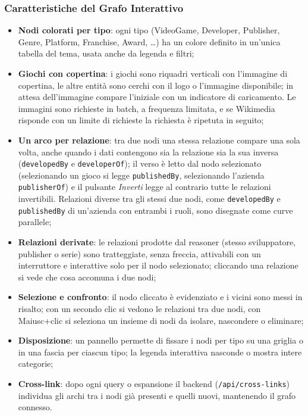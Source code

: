 \subsubsection{Caratteristiche del Grafo Interattivo}

\begin{itemize}[nosep]
  \item \textbf{Nodi colorati per tipo}: ogni tipo (VideoGame, Developer, Publisher, Genre, Platform,
    Franchise, Award, \dots) ha un colore definito in un'unica tabella del tema, usata anche da legenda e
    filtri;
  \item \textbf{Giochi con copertina}: i giochi sono riquadri verticali con l'immagine di copertina, le altre
    entit\`a sono cerchi con il logo o l'immagine disponibile; in attesa dell'immagine compare l'iniziale
    con un indicatore di caricamento. Le immagini sono richieste in batch, a frequenza limitata, e se
    Wikimedia risponde con un limite di richieste la richiesta \`e ripetuta in seguito;
  \item \textbf{Un arco per relazione}: tra due nodi una stessa relazione compare una sola volta, anche
    quando i dati contengono sia la relazione sia la sua inversa (\texttt{developedBy} e
    \texttt{developerOf}); il verso \`e letto dal nodo selezionato (selezionando un gioco si legge
    \texttt{publishedBy}, selezionando l'azienda \texttt{publisherOf}) e il pulsante \emph{Inverti} legge
    al contrario tutte le relazioni invertibili. Relazioni diverse tra gli stessi due nodi, come
    \texttt{developedBy} e \texttt{publishedBy} di un'azienda con entrambi i ruoli, sono disegnate come
    curve parallele;
  \item \textbf{Relazioni derivate}: le relazioni prodotte dal reasoner (stesso sviluppatore, publisher o
    serie) sono tratteggiate, senza freccia, attivabili con un interruttore e interattive solo per il nodo
    selezionato; cliccando una relazione si vede che cosa accomuna i due nodi;
  \item \textbf{Selezione e confronto}: il nodo cliccato \`e evidenziato e i vicini sono messi in
    risalto; con un secondo clic si vedono le relazioni tra due nodi, con Maiusc{+}clic si seleziona un
    insieme di nodi da isolare, nascondere o eliminare;
  \item \textbf{Disposizione}: un pannello permette di fissare i nodi per tipo su una griglia o in una fascia
    per ciascun tipo; la legenda interattiva nasconde o mostra intere categorie;
  \item \textbf{Cross-link}: dopo ogni query o espansione il backend (\texttt{/api/cross-links}) individua
    gli archi tra i nodi gi\`a presenti e quelli nuovi, mantenendo il grafo connesso.
\end{itemize}

